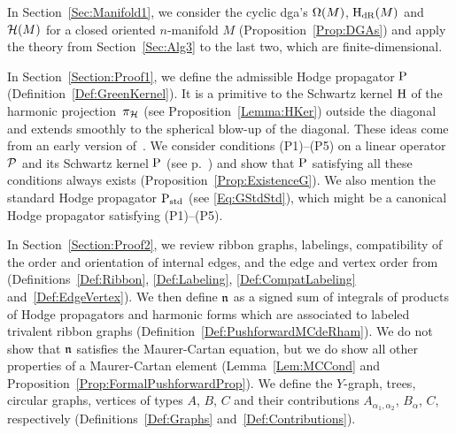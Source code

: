 \documentclass[\MainFolder/Text.tex]{subfiles}
\begin{document}
%

In Section~\ref{Sec:Manifold1}, we consider the cyclic dga's $\Omega(M)$, $\mathrm{H}_{\mathrm{dR}}(M)$ and $\mathcal{H}(M)$ for a closed oriented $n$-manifold $M$ (Proposition~\ref{Prop:DGAs}) and apply the theory from Section~\ref{Sec:Alg3} to the last two, which are finite-dimensional.

In Section~\ref{Section:Proof1}, we define the admissible Hodge propagator $\mathrm{P}$ (Definition~\ref{Def:GreenKernel}).
It is a primitive to the Schwartz kernel $\mathrm{H}$ of the harmonic projection~$\pi_{\mathcal{H}}$ (see Proposition~\ref{Lemma:HKer}) outside the diagonal and extends smoothly to the spherical blow-up of the diagonal. 
These ideas come from an early version of~\cite{Cieliebak2018}.
We consider conditions (P1)--(P5) on a linear operator $\mathcal{P}$ and its Schwartz kernel $\mathrm{P}$ (see p.~\pageref{ConditionsG}) and show that $\mathrm{P}$ satisfying all these conditions always exists (Proposition~\ref{Prop:ExistenceG}).
We also mention the standard Hodge propagator $\mathrm{P}_{\mathrm{std}}$ (see \eqref{Eq:GStdStd}), which might be a canonical Hodge propagator satisfying (P1)--(P5). 

In Section~\ref{Section:Proof2}, we review ribbon graphs, labelings, compatibility of the order and orientation of internal edges, and the edge and vertex order from~\cite{Cieliebak2015} (Definitions~\ref{Def:Ribbon}, \ref{Def:Labeling}, \ref{Def:CompatLabeling} and~\ref{Def:EdgeVertex}).
We then define $\mathfrak{n}$ as a signed sum of integrals of products of Hodge propagators and harmonic forms which are associated to labeled trivalent ribbon graphs (Definition~\ref{Def:PushforwardMCdeRham}).
We do not show that $\mathfrak{n}$ satisfies the Maurer-Cartan equation, but we do show all other properties of a Maurer-Cartan element (Lemma~\ref{Lem:MCCond} and Proposition~\ref{Prop:FormalPushforwardProp}).
We define the $Y$-graph, trees, circular graphs, vertices of types $A$, $B$, $C$ and their contributions $A_{\alpha_1, \alpha_2}$, $B_\alpha$, $C$, respectively (Definitions~\ref{Def:Graphs} and~\ref{Def:Contributions}). 
\end{document}
